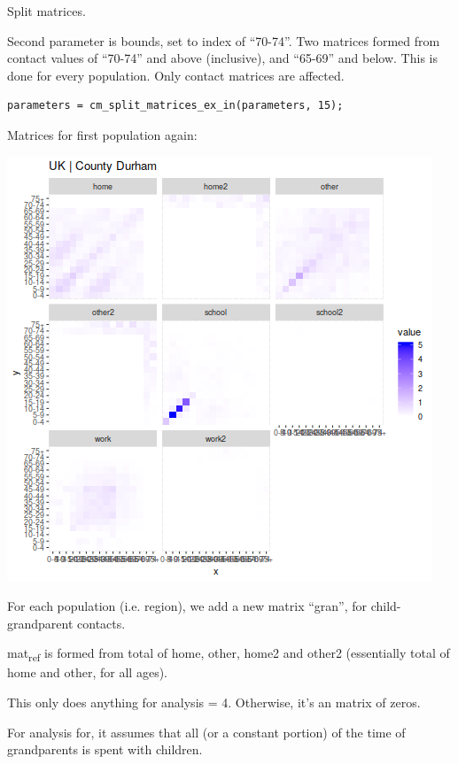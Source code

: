 \documentclass[11pt]{article}
\begin{document}
Split matrices.

Second parameter is bounds, set to index of ``70-74''. Two
matrices formed from contact values of ``70-74'' and above (inclusive), and
``65-69'' and below. This is done for every population.
Only contact matrices are affected.
\begin{verbatim}
parameters = cm_split_matrices_ex_in(parameters, 15);
\end{verbatim}

Matrices for first population again:
\begin{center}
\includegraphics[width=.9\linewidth]{1-home-parameters-after-split.png}
\end{center}

For each population (i.e. region), we add a new matrix ``gran'',
for child-grandparent contacts.

mat\textsubscript{ref} is formed from total of home, other, home2 and other2 (essentially total
of home and other, for all ages).

This only does anything for analysis = 4.
Otherwise, it's an matrix of zeros.

For analysis for, it assumes that all (or a constant portion) of the time of
grandparents is spent with children.
\end{document}
